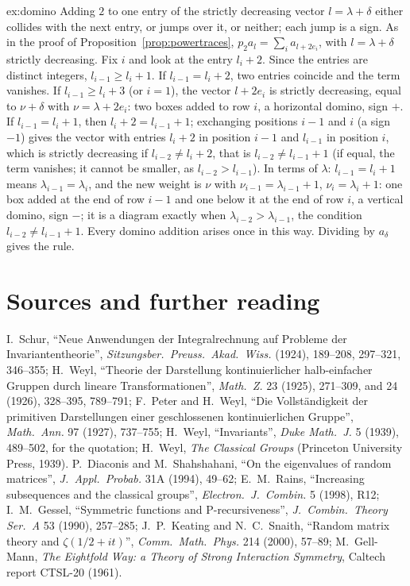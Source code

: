 \begin{solution}{ex:domino}
\idea Adding $2$ to one entry of the strictly decreasing vector $l=\lambda+\delta$ either collides with the next entry, or jumps over it, or neither; each jump is a sign.
\writeup As in the proof of Proposition~\ref{prop:powertraces}, $p_2a_l=\sum_ia_{l+2e_i}$, with $l=\lambda+\delta$ strictly decreasing. Fix $i$ and look at the entry $l_i+2$. Since the entries are distinct integers, $l_{i-1}\ge l_i+1$. If $l_{i-1}=l_i+2$, two entries coincide and the
term vanishes. If $l_{i-1}\ge l_i+3$ (or $i=1$), the vector $l+2e_i$ is strictly decreasing, equal to $\nu+\delta$ with $\nu=\lambda+2e_i$: two boxes added to row $i$, a horizontal domino, sign $+$. If $l_{i-1}=l_i+1$, then $l_i+2=l_{i-1}+1$; exchanging positions $i-1$ and $i$ (a
sign $-1$) gives the vector with entries $l_i+2$ in position $i-1$ and $l_{i-1}$ in position $i$, which is strictly decreasing if $l_{i-2}\ne l_i+2$, that is $l_{i-2}\ne l_{i-1}+1$ (if equal, the term vanishes; it cannot be smaller, as $l_{i-2}>l_{i-1}$). In terms of $\lambda$: $l_{i-1}=l_i+1$
means $\lambda_{i-1}=\lambda_i$, and the new weight is $\nu$ with $\nu_{i-1}=\lambda_{i-1}+1$, $\nu_i=\lambda_i+1$: one box added at the end of row $i-1$ and one below it at the end of row $i$, a vertical domino, sign $-$; it is a diagram exactly when $\lambda_{i-2}>\lambda_{i-1}$,
the condition $l_{i-2}\ne l_{i-1}+1$. Every domino addition arises once in this way. Dividing by $a_\delta$ gives the rule.
\end{solution}

\section*{Sources and further reading}

I.~Schur, ``Neue Anwendungen der Integralrechnung auf Probleme der Invariantentheorie'', \emph{Sitzungsber.\ Preuss.\ Akad.\ Wiss.} (1924), 189--208, 297--321, 346--355; H.~Weyl, ``Theorie der Darstellung kontinuierlicher halb-einfacher Gruppen durch lineare
Transformationen'', \emph{Math.\ Z.} 23 (1925), 271--309, and 24 (1926), 328--395, 789--791; F.~Peter and H.~Weyl, ``Die Vollständigkeit der primitiven Darstellungen einer geschlossenen kontinuierlichen Gruppe'', \emph{Math.\ Ann.} 97 (1927), 737--755;
H.~Weyl, ``Invariants'', \emph{Duke Math.\ J.} 5 (1939), 489--502, for the quotation; H.~Weyl, \emph{The Classical Groups} (Princeton University Press, 1939). P.~Diaconis and M.~Shahshahani, ``On the eigenvalues of random matrices'', \emph{J.\ Appl.\ Probab.} 31A (1994), 49--62;
E.~M.~Rains, ``Increasing subsequences and the classical groups'', \emph{Electron.\ J.\ Combin.} 5 (1998), R12; I.~M.~Gessel, ``Symmetric functions and P-recursiveness'', \emph{J.\ Combin.\ Theory Ser.\ A} 53 (1990), 257--285; J.~P.~Keating and N.~C.~Snaith, ``Random matrix
theory and $\zeta(1/2+it)$'', \emph{Comm.\ Math.\ Phys.} 214 (2000), 57--89; M.~Gell-Mann, \emph{The Eightfold Way: a Theory of Strong Interaction Symmetry}, Caltech report CTSL-20 (1961).

